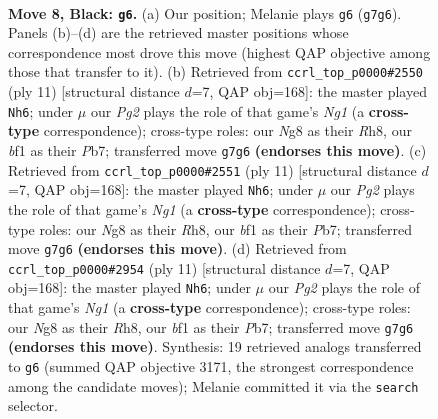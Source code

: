 \documentclass[11pt]{article}
\begin{document}
\begin{figure}[p]\centering
\begin{subfigure}{0.46\textwidth}\centering
\resizebox{\linewidth}{!}{%
\newchessgame
\chessboard[
  setfen={r1b1kbnr/pp3ppp/1qn1p3/2ppP3/3P2PP/P1P2N2/1P3P2/RNBQKB1R b KQkq - 0 8},
  showmover=false,
  pgfstyle=straightmove, color=movearrow, markmove={g7-g6}
]}
\caption{}
\end{subfigure}\hfill
\begin{subfigure}{0.46\textwidth}\centering
\resizebox{\linewidth}{!}{%
\newchessgame
\chessboard[
  setfen={r1b1kbnr/pp3ppp/1qn1p3/2ppP3/3P4/P1P2N2/1P3PPP/RNBQKB1R b KQkq - 0 6},
  showmover=false,
  pgfstyle=straightmove, color=movearrow, markmove={g8-h6}
]}
\caption{}
\end{subfigure}
\\[4pt]
\begin{subfigure}{0.46\textwidth}\centering
\resizebox{\linewidth}{!}{%
\newchessgame
\chessboard[
  setfen={r1b1kbnr/pp3ppp/1qn1p3/2ppP3/3P4/P1P2N2/1P3PPP/RNBQKB1R b KQkq - 0 6},
  showmover=false,
  pgfstyle=straightmove, color=movearrow, markmove={g8-h6}
]}
\caption{}
\end{subfigure}\hfill
\begin{subfigure}{0.46\textwidth}\centering
\resizebox{\linewidth}{!}{%
\newchessgame
\chessboard[
  setfen={r1b1kbnr/pp3ppp/1qn1p3/2ppP3/3P4/P1P2N2/1P3PPP/RNBQKB1R b KQkq - 0 6},
  showmover=false,
  pgfstyle=straightmove, color=movearrow, markmove={g8-h6}
]}
\caption{}
\end{subfigure}
\caption{\textbf{Move 8, Black: \texttt{g6}.} (a) Our position; Melanie plays \texttt{g6} (\texttt{g7g6}). Panels (b)--(d) are the retrieved master positions whose correspondence most drove this move (highest QAP objective among those that transfer to it). (b) Retrieved from \texttt{ccrl\_top\_p0000\#2550} (ply 11) [structural distance $d$=7, QAP obj=168]: the master played \texttt{Nh6}; under $\mu$ our \emph{Pg2} plays the role of that game's \emph{Ng1} (a \textbf{cross-type} correspondence); cross-type roles: our \emph{N}g8 as their \emph{R}h8, our \emph{b}f1 as their \emph{P}b7; transferred move \texttt{g7g6} \textbf{(endorses this move)}. (c) Retrieved from \texttt{ccrl\_top\_p0000\#2551} (ply 11) [structural distance $d$=7, QAP obj=168]: the master played \texttt{Nh6}; under $\mu$ our \emph{Pg2} plays the role of that game's \emph{Ng1} (a \textbf{cross-type} correspondence); cross-type roles: our \emph{N}g8 as their \emph{R}h8, our \emph{b}f1 as their \emph{P}b7; transferred move \texttt{g7g6} \textbf{(endorses this move)}. (d) Retrieved from \texttt{ccrl\_top\_p0000\#2954} (ply 11) [structural distance $d$=7, QAP obj=168]: the master played \texttt{Nh6}; under $\mu$ our \emph{Pg2} plays the role of that game's \emph{Ng1} (a \textbf{cross-type} correspondence); cross-type roles: our \emph{N}g8 as their \emph{R}h8, our \emph{b}f1 as their \emph{P}b7; transferred move \texttt{g7g6} \textbf{(endorses this move)}. Synthesis: 19 retrieved analogs transferred to \texttt{g6} (summed QAP objective 3171, the strongest correspondence among the candidate moves); Melanie committed it via the \texttt{search} selector.}
\label{fig:thought-m15}
\end{figure}
\end{document}
